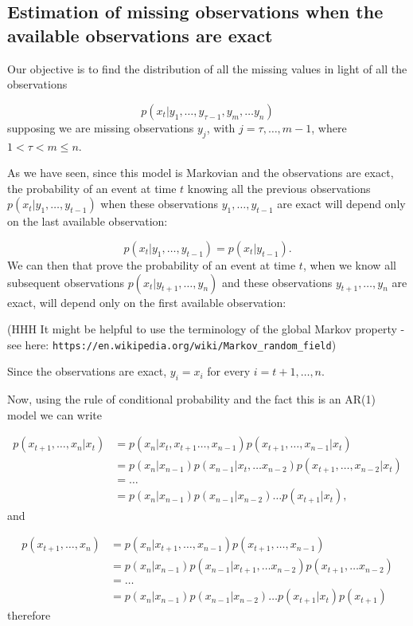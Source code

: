 \documentclass[11pt,a4paper]{article}
\begin{document}
\subsection{Estimation of missing observations when the available observations are exact}

{\color{blue} Our objective is to find the distribution of all the missing values in light of all the observations

\[
    p(x_t | y_1, \dots, y_{\tau-1}, y_m, \dots y_n) 
\]
supposing we are missing observations $y_j$, with $j = \tau, \dots, m - 1$, where $1 < \tau < m \leq n$.

As we have seen, since this model is Markovian and the observations are exact, the probability of an event at time $t$ knowing all the previous observations $p(x_t | y_1, \dots, y_{t-1})$ when these observations $y_1, \dots, y_{t-1}$ are exact will depend only on the last available observation:

\[
    p(x_t | y_1, \dots ,y_{t-1}) = p(x_t | y_{t-1}).
\]
We can then that prove the probability of an event at time $t$, when we know all subsequent observations $p(x_t | y_{t+1}, \dots, y_n)$ and these observations $y_{t+1}, \dots, y_n$ are exact, will depend only on the first available observation:

{\color{red} (HHH It might be helpful to use the terminology of the global Markov property - see here:
\verb|https://en.wikipedia.org/wiki/Markov_random_field|)}

Since the observations are exact, $y_i = x_i$ for every $i = t+1, \dots, n$.

Now, using the rule of conditional probability and the fact this is an AR(1) model we can write

\begin{align*}
    p(x_{t+1}, \dots, x_n | x_t) &= p(x_n | x_t, x_{t+1} \dots, x_{n-1}) p(x_{t+1}, \dots, x_{n-1} | x_t)\\
    &= p(x_n | x_{n-1}) p(x_{n-1} | x_t, \dots x_{n-2}) p(x_{t+1}, \dots, x_{n-2} | x_t)\\
    &= \dots\\
    &= p(x_n | x_{n-1})p(x_{n-1} | x_{n-2}) \dots p(x_{t+1} | x_t),
\end{align*}
and

\begin{align*}
    p(x_{t+1}, \dots, x_n) &= p(x_n | x_{t+1}, \dots, x_{n-1}) p(x_{t+1}, \dots, x_{n-1})\\
    &= p(x_n | x_{n-1}) p(x_{n-1} | x_{t+1}, \dots x_{n-2}) p(x_{t+1}, \dots x_{n-2})\\
    &= \dots\\
    &= p(x_n | x_{n-1})p(x_{n-1} | x_{n-2}) \dots p(x_{t+1} | x_t) p(x_{t+1})
\end{align*}
therefore

}
\end{document}
